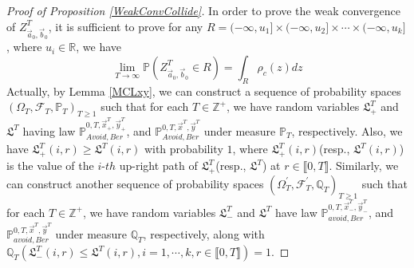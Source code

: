 \begin{proof}[Proof of Proposition \ref{WeakConvCollide}]
In order to prove the weak convergence of $Z^{T}_{\vec{a}_{0},\vec{b}_{0}}$, it is sufficient to prove for any $R=(-\infty,u_{1}]\times(-\infty,u_{2}]\times\cdots\times(-\infty,u_{k}]$, where $u_{i}\in\mathbb{R}$, we have 
\begin{equation}
	\lim_{T\rightarrow\infty}\mathbb{P}(Z^{T}_{\vec{a}_{0},\vec{b}_{0}}\in R)=\int_{R}\rho_{c}(z)dz
\end{equation}
Actually, by Lemma \ref{MCLxy}, we can construct a sequence of probability spaces $(\Omega_{T},\mathcal{F}_{T},\mathbb{P}_{T})_{T\geq 1}$ such that for each $T\in\mathbb{Z}^{+}$, we have random variables $\mathfrak{L}_{+}^{T}$ and $\mathfrak{L}^{T}$ having law $\mathbb{P}_{Avoid,Ber}^{0,T,\vec{x}^{T}_{+},\vec{y}^{T}_{+}}$, and $\mathbb{P}_{Avoid,Ber}^{0,T,\vec{x}^{T},\vec{y}^{T}}$ under measure $\mathbb{P}_{T}$, respectively. Also, we have $\mathfrak{L}_{+}^{T}(i,r)\geq \mathfrak{L}^{T}(i,r)$ with probability $1$, where $\mathfrak{L}_{+}^{T}(i,r)$(resp., $\mathfrak{L}^{T}(i,r)$) is the value of the $i$-$th$ up-right path of $\mathfrak{L}_{+}^{T}$(resp., $\mathfrak{L}^{T}$) at $r\in\llbracket 0,T\rrbracket$. Similarly, we can construct another sequence of probability spaces $(\Omega_{T}^{\prime},\mathcal{F}_{T}^{\prime},\mathbb{Q}_{T})_{T\geq 1}$ such that for each $T\in\mathbb{Z}^{+}$, we have random variables $\mathfrak{L}_{-}^{T}$ and $\mathfrak{L}^{T}$ have law $\mathbb{P}_{avoid,Ber}^{0,T,\vec{x}^{T}_{-},\vec{y}^{T}_{-}}$, and $\mathbb{P}_{avoid,Ber}^{0,T,\vec{x}^{T},\vec{y}^{T}}$ under measure $\mathbb{Q}_{T}$, respectively, along with $\mathbb{Q}_{T}\left(\mathfrak{L}_{-}^{T}(i,r)\leq \mathfrak{L}^{T}(i,r), i=1,\cdots, k, r\in\llbracket 0,T\rrbracket\right)=1$.


\end{proof}
